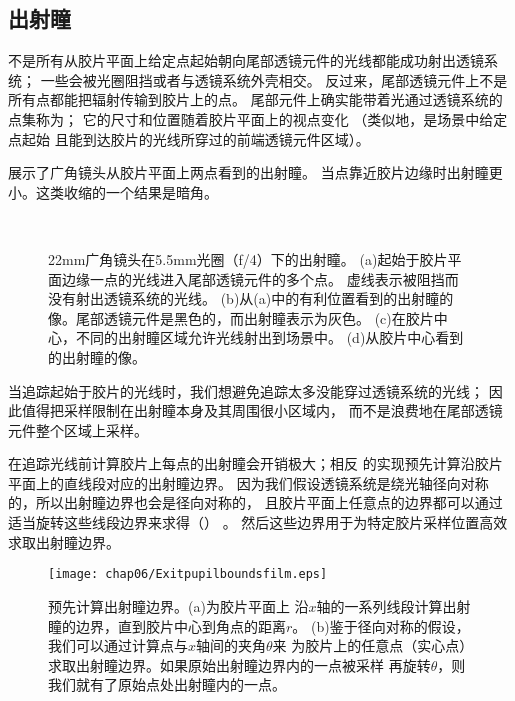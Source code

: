 \subsection{出射瞳}\label{sub:出射瞳}
不是所有从胶片平面上给定点起始朝向尾部透镜元件的光线都能成功射出透镜系统；
一些会被光圈阻挡或者与透镜系统外壳相交。
反过来，尾部透镜元件上不是所有点都能把辐射传输到胶片上的点。
尾部元件上确实能带着光通过透镜系统的点集称为；
它的尺寸和位置随着胶片平面上的视点变化
（类似地，是场景中给定点起始
且能到达胶片的光线所穿过的前端透镜元件区域）。

展示了广角镜头从胶片平面上两点看到的出射瞳。
当点靠近胶片边缘时出射瞳更小。这类收缩的一个结果是暗角。
\begin{figure}[htbp]
    \centering
    \qquad
    \\
    \qquad
    \caption{22mm广角镜头在5.5mm光圈（f/4）下的出射瞳。
        (a)起始于胶片平面边缘一点的光线进入尾部透镜元件的多个点。
        虚线表示被阻挡而没有射出透镜系统的光线。
        (b)从(a)中的有利位置看到的出射瞳的像。尾部透镜元件是黑色的，而出射瞳表示为灰色。
        (c)在胶片中心，不同的出射瞳区域允许光线射出到场景中。
        (d)从胶片中心看到的出射瞳的像。}
    \label{fig:6.21}
\end{figure}

当追踪起始于胶片的光线时，我们想避免追踪太多没能穿过透镜系统的光线；
因此值得把采样限制在出射瞳本身及其周围很小区域内，
而不是浪费地在尾部透镜元件整个区域上采样。

在追踪光线前计算胶片上每点的出射瞳会开销极大；相反
的实现预先计算沿胶片平面上的直线段对应的出射瞳边界。
因为我们假设透镜系统是绕光轴径向对称的，所以出射瞳边界也会是径向对称的，
且胶片平面上任意点的边界都可以通过适当旋转这些线段边界来求得（）
。
然后这些边界用于为特定胶片采样位置高效求取出射瞳边界。
\begin{figure}[htbp]
    \centering\texttt{[image: chap06/Exitpupilboundsfilm.eps]}
    \caption{预先计算出射瞳边界。(a)为胶片平面上
        沿$x$轴的一系列线段计算出射瞳的边界，直到胶片中心到角点的距离$r$。
        (b)鉴于径向对称的假设，我们可以通过计算点与$x$轴间的夹角$\theta$来
        为胶片上的任意点（实心点）求取出射瞳边界。如果原始出射瞳边界内的一点被采样
        再旋转$\theta$，则我们就有了原始点处出射瞳内的一点。}
    \label{fig:6.22}
\end{figure}

